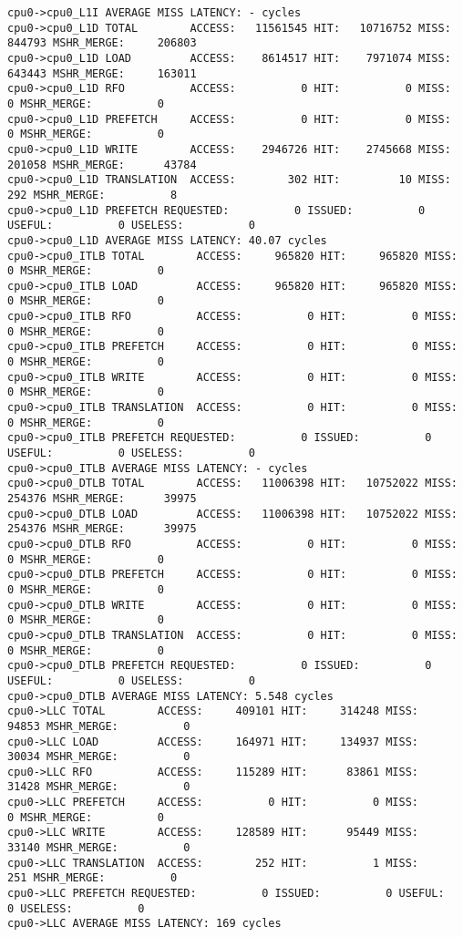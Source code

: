 \documentclass[17pt]{article}
\begin{document}
\begin{LTR}
\begin{lstlisting}[basicstyle=\tiny\ttfamily]
cpu0->cpu0_L1I AVERAGE MISS LATENCY: - cycles
cpu0->cpu0_L1D TOTAL        ACCESS:   11561545 HIT:   10716752 MISS:     844793 MSHR_MERGE:     206803
cpu0->cpu0_L1D LOAD         ACCESS:    8614517 HIT:    7971074 MISS:     643443 MSHR_MERGE:     163011
cpu0->cpu0_L1D RFO          ACCESS:          0 HIT:          0 MISS:          0 MSHR_MERGE:          0
cpu0->cpu0_L1D PREFETCH     ACCESS:          0 HIT:          0 MISS:          0 MSHR_MERGE:          0
cpu0->cpu0_L1D WRITE        ACCESS:    2946726 HIT:    2745668 MISS:     201058 MSHR_MERGE:      43784
cpu0->cpu0_L1D TRANSLATION  ACCESS:        302 HIT:         10 MISS:        292 MSHR_MERGE:          8
cpu0->cpu0_L1D PREFETCH REQUESTED:          0 ISSUED:          0 USEFUL:          0 USELESS:          0
cpu0->cpu0_L1D AVERAGE MISS LATENCY: 40.07 cycles
cpu0->cpu0_ITLB TOTAL        ACCESS:     965820 HIT:     965820 MISS:          0 MSHR_MERGE:          0
cpu0->cpu0_ITLB LOAD         ACCESS:     965820 HIT:     965820 MISS:          0 MSHR_MERGE:          0
cpu0->cpu0_ITLB RFO          ACCESS:          0 HIT:          0 MISS:          0 MSHR_MERGE:          0
cpu0->cpu0_ITLB PREFETCH     ACCESS:          0 HIT:          0 MISS:          0 MSHR_MERGE:          0
cpu0->cpu0_ITLB WRITE        ACCESS:          0 HIT:          0 MISS:          0 MSHR_MERGE:          0
cpu0->cpu0_ITLB TRANSLATION  ACCESS:          0 HIT:          0 MISS:          0 MSHR_MERGE:          0
cpu0->cpu0_ITLB PREFETCH REQUESTED:          0 ISSUED:          0 USEFUL:          0 USELESS:          0
cpu0->cpu0_ITLB AVERAGE MISS LATENCY: - cycles
cpu0->cpu0_DTLB TOTAL        ACCESS:   11006398 HIT:   10752022 MISS:     254376 MSHR_MERGE:      39975
cpu0->cpu0_DTLB LOAD         ACCESS:   11006398 HIT:   10752022 MISS:     254376 MSHR_MERGE:      39975
cpu0->cpu0_DTLB RFO          ACCESS:          0 HIT:          0 MISS:          0 MSHR_MERGE:          0
cpu0->cpu0_DTLB PREFETCH     ACCESS:          0 HIT:          0 MISS:          0 MSHR_MERGE:          0
cpu0->cpu0_DTLB WRITE        ACCESS:          0 HIT:          0 MISS:          0 MSHR_MERGE:          0
cpu0->cpu0_DTLB TRANSLATION  ACCESS:          0 HIT:          0 MISS:          0 MSHR_MERGE:          0
cpu0->cpu0_DTLB PREFETCH REQUESTED:          0 ISSUED:          0 USEFUL:          0 USELESS:          0
cpu0->cpu0_DTLB AVERAGE MISS LATENCY: 5.548 cycles
cpu0->LLC TOTAL        ACCESS:     409101 HIT:     314248 MISS:      94853 MSHR_MERGE:          0
cpu0->LLC LOAD         ACCESS:     164971 HIT:     134937 MISS:      30034 MSHR_MERGE:          0
cpu0->LLC RFO          ACCESS:     115289 HIT:      83861 MISS:      31428 MSHR_MERGE:          0
cpu0->LLC PREFETCH     ACCESS:          0 HIT:          0 MISS:          0 MSHR_MERGE:          0
cpu0->LLC WRITE        ACCESS:     128589 HIT:      95449 MISS:      33140 MSHR_MERGE:          0
cpu0->LLC TRANSLATION  ACCESS:        252 HIT:          1 MISS:        251 MSHR_MERGE:          0
cpu0->LLC PREFETCH REQUESTED:          0 ISSUED:          0 USEFUL:          0 USELESS:          0
cpu0->LLC AVERAGE MISS LATENCY: 169 cycles


\end{lstlisting}
\end{LTR}
\end{document}
